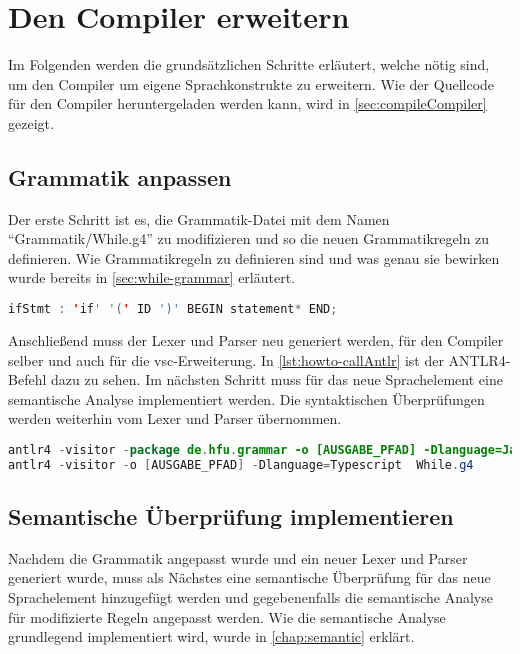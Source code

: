 \section{Den Compiler erweitern} 

Im Folgenden werden die grundsätzlichen Schritte erläutert, welche nötig sind, um den Compiler um eigene Sprachkonstrukte zu erweitern. Wie der Quellcode für den Compiler heruntergeladen werden kann, wird in \cref{sec:compileCompiler} gezeigt.

\subsection{Grammatik anpassen}
Der erste Schritt ist es, die Grammatik-Datei mit dem Namen \enquote{Grammatik/While.g4} zu modifizieren und so die neuen Grammatikregeln zu definieren. Wie Grammatikregeln zu definieren sind und was genau sie bewirken wurde bereits in \cref{sec:while-grammar} erläutert.  

\begin{lstlisting}[language=java, caption=Grammatikregel für ein IF, label={lst:howto-grammar-if}]
ifStmt : 'if' '(' ID ')' BEGIN statement* END;
\end{lstlisting}

Anschließend muss der Lexer und Parser neu generiert werden, für den Compiler selber und auch für die \ac{vsc}-Erweiterung. In \cref{lst:howto-callAntlr} ist der ANTLR4-Befehl dazu zu sehen. Im nächsten Schritt muss für das neue Sprachelement eine semantische Analyse implementiert werden. Die syntaktischen Überprüfungen werden weiterhin vom Lexer und Parser übernommen.

\begin{lstlisting}[language=java, caption=ANTLR4 aufrufen, label={lst:howto-callAntlr}]
antlr4 -visitor -package de.hfu.grammar -o [AUSGABE_PFAD] -Dlanguage=Java  While.g4
antlr4 -visitor -o [AUSGABE_PFAD] -Dlanguage=Typescript  While.g4
\end{lstlisting}

\subsection{Semantische Überprüfung implementieren}
Nachdem die Grammatik angepasst wurde und ein neuer Lexer und Parser generiert wurde, muss als Nächstes eine semantische Überprüfung für das neue Sprachelement hinzugefügt werden und gegebenenfalls die semantische Analyse für modifizierte Regeln angepasst werden. Wie die semantische Analyse grundlegend implementiert wird, wurde in \cref{chap:semantic} erklärt.

